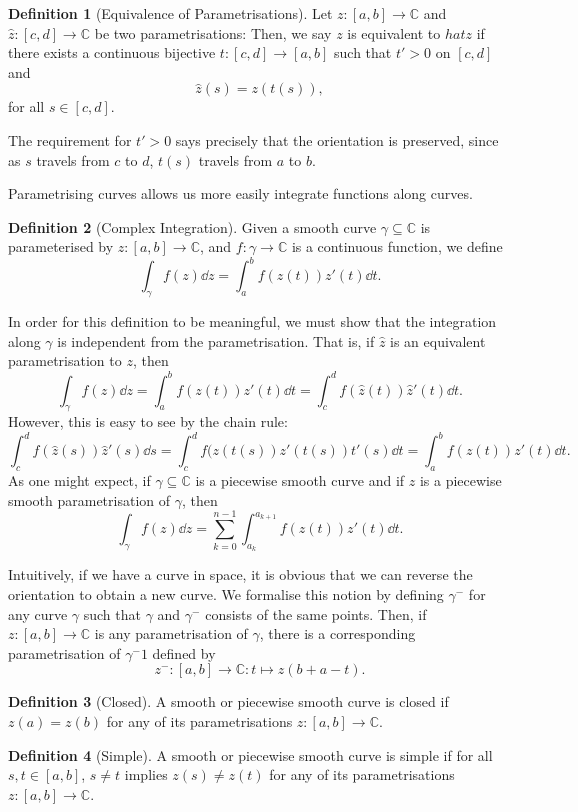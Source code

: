 \documentclass[
]{article}
\theoremstyle{definition}
\theoremstyle{definition}
\newtheorem{definition}{Definition}[section]
\begin{document}
\begin{definition}[Equivalence of Parametrisations]
  Let \(z : [a, b] \to \mathbb{C}\) and \(\hat{z} : [c, d] \to \mathbb{C}\) be two 
  parametrisations: Then, we say \(z\) is equivalent to \(hat{z}\) if there exists a 
  continuous bijective \(t : [c, d] \to [a, b]\) such that \(t' > 0\) on \([c, d]\) 
  and 
  \[\hat{z}(s) = z(t(s)),\]
  for all \(s \in [c, d]\).
\end{definition}

The requirement for \(t' > 0\) says precisely that the orientation is
preserved, since as \(s\) travels from \(c\) to \(d\), \(t(s)\) travels
from \(a\) to \(b\).

Parametrising curves allows us more easily integrate functions along
curves.

\begin{definition}[Complex Integration]
  Given a smooth curve \(\gamma \subseteq \mathbb{C}\) is parameterised by 
  \(z : [a, b] \to \mathbb{C}\), and \(f : \gamma \to \mathbb{C}\) is a 
  continuous function, we define 
  \[\int_\gamma f(z) \dd z = \int_a^b f(z(t)) z'(t) \dd t.\]
\end{definition}

In order for this definition to be meaningful, we must show that the
integration along \(\gamma\) is independent from the parametrisation.
That is, if \(\hat{z}\) is an equivalent parametrisation to \(z\),
then\\
\[\int_\gamma f(z) \dd z = \int_a^b f(z(t)) z'(t) \dd t = \int_c^d f(\hat{z}(t)) \hat{z}'(t) \dd t.\]
However, this is easy to see by the chain rule:
\[\int_c^d f(\hat{z}(s)) \hat{z}'(s) \dd s
  = \int_c^d f(z(t(s)) z'(t(s)) t'(s) \dd t = \int_a^b f(z(t)) z'(t) \dd t.\]
As one might expect, if \(\gamma \subseteq \mathbb{C}\) is a piecewise
smooth curve and if \(z\) is a piecewise smooth parametrisation of
\(\gamma\), then
\[\int_\gamma f(z) \dd z = \sum_{k = 0}^{n - 1} \int_{a_k}^{a_{k + 1}} f(z(t)) z'(t) \dd t.\]

Intuitively, if we have a curve in space, it is obvious that we can
reverse the orientation to obtain a new curve. We formalise this notion
by defining \(\gamma^-\) for any curve \(\gamma\) such that \(\gamma\)
and \(\gamma^-\) consists of the same points. Then, if
\(z : [a, b] \to \mathbb{C}\) is any parametrisation of \(\gamma\),
there is a corresponding parametrisation of \(\gamma^-1\) defined by
\[z^- : [a, b] \to \mathbb{C} : t \mapsto z(b + a - t).\]

\begin{definition}[Closed]
  A smooth or piecewise smooth curve is closed if \(z(a) = z(b)\) for any of 
  its parametrisations \(z : [a, b] \to \mathbb{C}\).
\end{definition}
\begin{definition}[Simple]
  A smooth or piecewise smooth curve is simple if for all \(s, t \in [a, b]\), 
  \(s \neq t\) implies \(z(s) \neq z(t)\) for any of its parametrisations 
  \(z : [a, b] \to \mathbb{C}\).
\end{definition}
\end{document}
